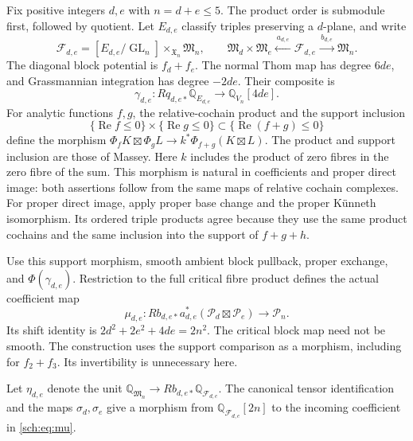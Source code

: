 Fix positive integers $d,e$ with $n=d+e\leq5$. The product order is
submodule first, followed by quotient. Let $E_{d,e}$ classify triples
preserving a $d$-plane, and write
\[
 \mathcal F_{d,e}=[E_{d,e}/\operatorname{GL}_n]
                         \mathbin{\times}_{\mathfrak X_n}\mathfrak M_n,
 \qquad
 \mathfrak M_d\times\mathfrak M_e
 \xleftarrow{\ a_{d,e}\ }\mathcal F_{d,e}
 \xrightarrow{\ b_{d,e}\ }\mathfrak M_n.
\]
The diagonal block potential is $f_d+f_e$.
The normal Thom map has degree $6de$, and Grassmannian integration
has degree $-2de$. Their composite is
\[
 \gamma_{d,e}:Rq_{d,e*}\mathbb Q_{E_{d,e}}
                      \longrightarrow\mathbb Q_{V_n}[4de].
\]
For analytic functions $f,g$, the relative-cochain product and the
support inclusion
\[
 \{\operatorname{Re}f\leq0\}\times\{\operatorname{Re}g\leq0\}
       \subset\{\operatorname{Re}(f+g)\leq0\}
\]
define the morphism
$\Phi_fK\boxtimes\Phi_gL\to k^*\Phi_{f+g}(K\boxtimes L)$.
The product and support inclusion are those of
Massey\cite[Lemma~1.2, p.~3, and Proposition~1.4, p.~5]{schMasseyST}.
Here $k$ includes the product of zero fibres in the zero fibre of the sum.
This morphism is natural in coefficients and proper direct image:
both assertions follow from the same maps of relative cochain complexes.
For proper direct image, apply proper base change and the proper
K\"unneth isomorphism\cite[\S1, pp.~13--14]{schMasseyNotes}.
Its ordered triple products agree because they use the same product
cochains and the same inclusion into the support of $f+g+h$.

Use this support morphism, smooth ambient block pullback, proper
exchange, and $\Phi(\gamma_{d,e})$. Restriction to the full critical
fibre product defines the actual coefficient map
\begin{equation}
 \mu_{d,e}:Rb_{d,e*}a_{d,e}^*
       (\mathcal P_d\boxtimes\mathcal P_e)\longrightarrow\mathcal P_n.
 \label{sch:eq:mu}
\end{equation}
Its shift identity is $2d^2+2e^2+4de=2n^2$.
The critical block map need not be smooth.
The construction uses the support comparison as a morphism, including
for $f_2+f_3$. Its invertibility is unnecessary here.

Let $\eta_{d,e}$ denote the unit
$\mathbb Q_{\mathfrak M_n}\to Rb_{d,e*}\mathbb Q_{\mathcal F_{d,e}}$.
The canonical tensor identification and the maps $\sigma_d,\sigma_e$
give a morphism from $\mathbb Q_{\mathcal F_{d,e}}[2n]$ to the
incoming coefficient in \eqref{sch:eq:mu}.

